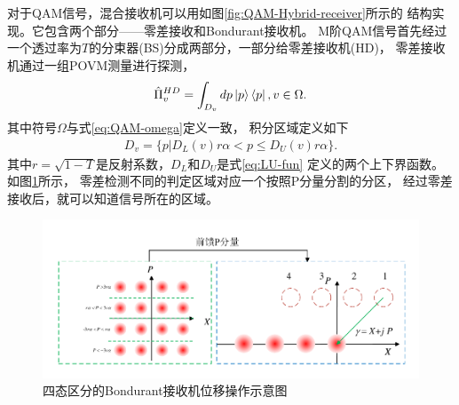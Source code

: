对于QAM信号，混合接收机可以用如图\ref{fig:QAM-Hybrid-receiver}所示的
结构实现。它包含两个部分——零差接收和Bondurant接收机。
M阶QAM信号首先经过一个透过率为$T$的分束器(BS)分成两部分，一部分给零差接收机(HD)，
零差接收机通过一组POVM测量进行探测，
\begin{equation}
\hat{\Pi}_v^{HD} = \int_{D_v} dp \ket{p}\bra{p}, v\in \Omega.
\end{equation}
其中符号$\Omega$与式\ref{eq:QAM-omega}定义一致，
积分区域定义如下
\begin{equation}
\begin{split}
D_v = \{p| D_L(v)r\alpha < p \le D_U(v) r\alpha\}.
\end{split}
\end{equation}
其中$r=\sqrt{1-T}$是反射系数，$D_L$和$D_U$是式\ref{eq:LU-fun}
定义的两个上下界函数。
如图\ref{fig:Q-Bondurant-displacemet}所示，
零差检测不同的判定区域对应一个按照P分量分割的分区，
经过零差接收后，就可以知道信号所在的区域。


\begin{figure}
\centering
  \includegraphics[width=\textwidth]{figures/chap3/Q-Bondurant-displacemet}
  \caption{四态区分的Bondurant接收机位移操作示意图}
  \label{fig:Q-Bondurant-displacemet}
\end{figure}


